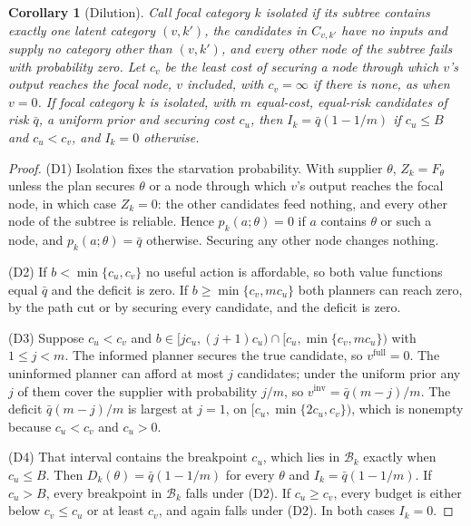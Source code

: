 \documentclass[pdflatex,sn-mathphys-num]{sn-jnl}
\theoremstyle{thmstyleone}
\newtheorem{corollary}[theorem]{Corollary}
\theoremstyle{thmstyletwo}
\theoremstyle{thmstylethree}
\begin{document}
\begin{corollary}[Dilution]\label{cor:dilution}
Call focal category $k$ \emph{isolated} if its subtree contains exactly one
latent category $(v,k')$, the candidates in $C_{v,k'}$ have no inputs and
supply no category other than $(v,k')$, and every other node of the subtree
fails with probability zero. Let $c_v$ be the least cost of securing a node
through which $v$'s output reaches the focal node, $v$ included, with
$c_v=\infty$ if there is none, as when $v=0$. If focal category $k$ is
isolated, with $m$ equal-cost, equal-risk candidates of risk $\bar q$, a
uniform prior and securing cost $c_u$, then
$I_k=\bar q(1-1/m)$ if $c_u\le B$ and $c_u<c_v$, and $I_k=0$ otherwise.
\end{corollary}

\begin{proof}
(D1) Isolation fixes the starvation probability. With supplier $\theta$,
$Z_k=F_\theta$ unless the plan secures $\theta$ or a node through which $v$'s
output reaches the focal node, in which case $Z_k=0$: the other candidates
feed nothing, and every other node of the subtree is reliable. Hence
$p_k(a;\theta)=0$ if $a$ contains $\theta$ or such a node, and
$p_k(a;\theta)=\bar q$ otherwise. Securing any other node changes nothing.

\noindent(D2) If $b<\min\{c_u,c_v\}$ no useful action is affordable, so both
value functions equal $\bar q$ and the deficit is zero. If
$b\ge\min\{c_v,mc_u\}$ both planners can reach zero, by the path cut or by
securing every candidate, and the deficit is zero.

\noindent(D3) Suppose $c_u<c_v$ and
$b\in[jc_u,(j+1)c_u)\cap[c_u,\min\{c_v,mc_u\})$ with $1\le j<m$. The
informed planner secures the true candidate, so $v^{\mathrm{full}}=0$. The
uninformed planner can afford at most $j$ candidates; under the uniform prior
any $j$ of them cover the supplier with probability $j/m$, so
$v^{\mathrm{inv}}=\bar q(m-j)/m$. The deficit $\bar q(m-j)/m$ is largest at
$j=1$, on $[c_u,\min\{2c_u,c_v\})$, which is nonempty because $c_u<c_v$ and
$c_u>0$.

\noindent(D4) That interval contains the breakpoint $c_u$, which lies in
$\mathcal B_k$ exactly when $c_u\le B$. Then $D_k(\theta)=\bar q(1-1/m)$ for
every $\theta$ and $I_k=\bar q(1-1/m)$. If $c_u>B$, every breakpoint in
$\mathcal B_k$ falls under (D2). If $c_u\ge c_v$, every budget is either below
$c_v\le c_u$ or at least $c_v$, and again falls under (D2). In both cases
$I_k=0$.
\end{proof}
\end{document}
